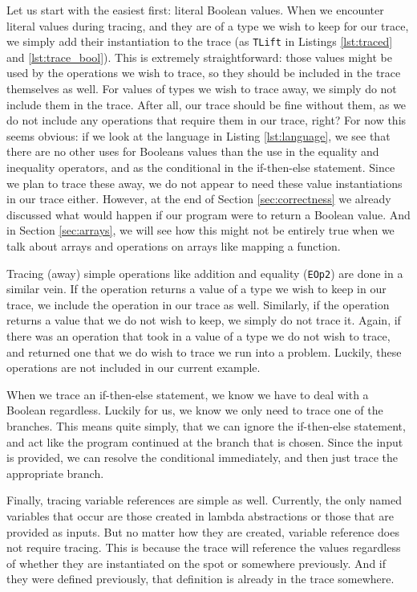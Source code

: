         Let us start with the easiest first: literal Boolean values.
        When we encounter literal values during tracing, and they are of a type we wish to keep for our trace, we simply add their instantiation to the trace (as \texttt{TLift} in Listings \ref{lst:traced} and \ref{lst:trace_bool}).
        This is extremely straightforward: those values might be used by the operations we wish to trace, so they should be included in the trace themselves as well.
        For values of types we wish to trace away, we simply do not include them in the trace.
        After all, our trace should be fine without them, as we do not include any operations that require them in our trace, right?
        For now this seems obvious: if we look at the language in Listing \ref{lst:language}, we see that there are no other uses for Booleans values than the use in the equality and inequality operators, and as the conditional in the if-then-else statement.
        Since we plan to trace these away, we do not appear to need these value instantiations in our trace either.
        However, at the end of Section \ref{sec:correctness} we already discussed what would happen if our program were to return a Boolean value.
        And in Section \ref{sec:arrays}, we will see how this might not be entirely true when we talk about arrays and operations on arrays like mapping a function.
        
        Tracing (away) simple operations like addition and equality (\texttt{EOp2}) are done in a similar vein.
        If the operation returns a value of a type we wish to keep in our trace, we include the operation in our trace as well.
        Similarly, if the operation returns a value that we do not wish to keep, we simply do not trace it.
        Again, if there was an operation that took in a value of a type we do not wish to trace, and returned one that we do wish to trace we run into a problem.
        Luckily, these operations are not included in our current example.

        When we trace an if-then-else statement, we know we have to deal with a Boolean regardless.
        Luckily for us, we know we only need to trace one of the branches.
        This means quite simply, that we can ignore the if-then-else statement, and act like the program continued at the branch that is chosen.
        Since the input is provided, we can resolve the conditional immediately, and then just trace the appropriate branch.

        Finally, tracing variable references are simple as well.
        Currently, the only named variables that occur are those created in lambda abstractions or those that are provided as inputs.
        But no matter how they are created, variable reference does not require tracing.
        This is because the trace will reference the values regardless of whether they are instantiated on the spot or somewhere previously.
        And if they were defined previously, that definition is already in the trace somewhere.

